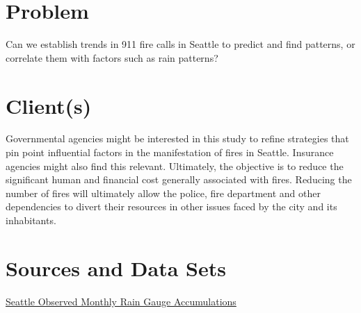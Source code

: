 \documentclass[12pt,a4paper]{article}
\begin{document}

\newpage

\tableofcontents

\newpage

\section{Problem}

Can we establish trends in 911 fire calls in Seattle to predict and find patterns, or correlate them with factors such as rain patterns?

\section{Client(s)}

Governmental agencies might be interested in this study to refine strategies that pin point influential factors in the manifestation of fires in Seattle. Insurance agencies might also find this relevant. Ultimately, the objective is to reduce the significant human and financial cost generally associated with fires. Reducing the number of fires will ultimately allow the police, fire department and other dependencies to divert their resources in other issues faced by the city and its inhabitants.

\section{Sources and Data Sets}


{\large \href{https://www.kaggle.com/city-of-seattle/seattle-observed-monthly-rain-gauge-accumulations/version/16}{Seattle Observed Monthly Rain Gauge Accumulations} \cite{Daniels2018}}
\end{document}
